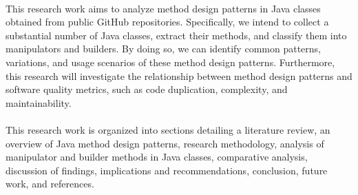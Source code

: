 \documentclass[draft]{article}
\begin{document}
~\\
This research work aims to analyze method design patterns in Java classes obtained from public GitHub repositories. Specifically, we intend to collect a substantial number of Java classes, extract their methods, and classify them into manipulators and builders. By doing so, we can identify common patterns, variations, and usage scenarios of these method design patterns. Furthermore, this research will investigate the relationship between method design patterns and software quality metrics, such as code duplication, complexity, and maintainability.\\
~\\
This research work is organized into sections detailing a literature review, an overview of Java method design patterns, research methodology, analysis of manipulator and builder methods in Java classes, comparative analysis, discussion of findings, implications and recommendations, conclusion, future work, and references.\\
~\\

\newpage
\end{document}
